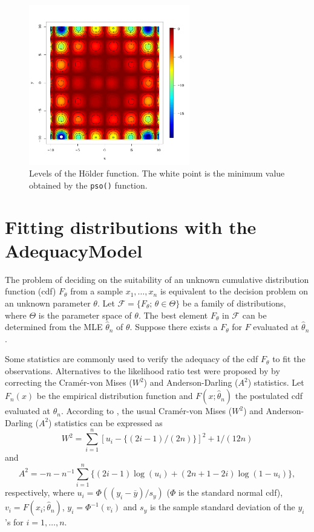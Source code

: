 \documentclass[10pt,letterpaper]{article}
\begin{document}
\begin{figure}[H]
\centering
\includegraphics[width=7cm,height=7cm]{curve_holder}
\caption{Levels of the H\"{o}lder function.
The white point is the minimum value obtained by the \texttt{pso()} function.}
\label{curves_holder}
\end{figure}


\section{Fitting distributions with the AdequacyModel}

The problem of deciding on the suitability of an unknown cumulative distribution function (cdf) $F_\theta$
from a sample $x_1,\ldots,x_n$ is equivalent to the decision problem on an unknown parameter $\theta$.
Let $\mathcal{F} = \{F_\theta;\,\theta \in \Theta \}$ be a family of distributions, where $\Theta$ is the parameter space of $\theta$.
The best element $F_{\theta}$ in $\mathcal{F}$ can be determined from the MLE $\widehat{\theta}_n$ of $\theta$.
Suppose there exists a $F_{\theta}$ for $F$ evaluated at $\widehat{\theta}_n$.

Some statistics are commonly used to verify the adequacy of the cdf $F_\theta$ to fit the observations.
Alternatives to the likelihood ratio test were proposed by \cite{chen1995general} by correcting the Cram\'er-von Mises ($W^2$) and Anderson-Darling ($A^2$) statistics.
Let $F_n(x)$ be the empirical distribution function and $F(x;\widehat \theta_n)$ the postulated cdf evaluated at $\widehat \theta_n$.
According to \cite{chen1995general}, the usual Cram\'er-von Mises ($W^2$) and Anderson-Darling ($A^2$) statistics can be expressed as
\begin{equation}
\label{eq:w2}
W^2 = \sum_{i=1}^{n}[u_i - \{(2i-1)/(2n) \}]^2 + 1/(12n)
\end{equation}
and
\begin{equation}
\label{eq:a2}
A^2 = -n - n^{-1}\sum_{i=1}^{n}\{(2i-1)\log(u_i) + (2n+1-2i)\log(1-u_i)\},
\end{equation}
respectively, where $u_i = \Phi((y_i-\overline{y})/s_y)$ ($\Phi$ is the standard normal cdf),
$v_i = F(x_i; \widehat \theta_n)$, $y_i = \Phi^{-1}(v_i)$ and $s_y$ is the sample standard deviation of the $y_i$'s for $i=1,\ldots, n$.
\end{document}
